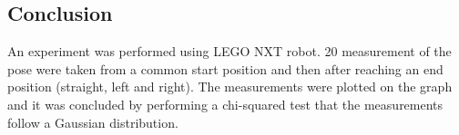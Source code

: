 \documentclass[10pt,a4paper]{article}
\begin{document}
\subsection{Conclusion}
An experiment was performed using LEGO NXT robot. 
20 measurement of the pose were taken from a common start position and then after reaching an end position (straight, left and right).
The measurements were plotted on the graph and it was concluded by performing a chi-squared test that the measurements follow a Gaussian distribution.  
\end{document}
